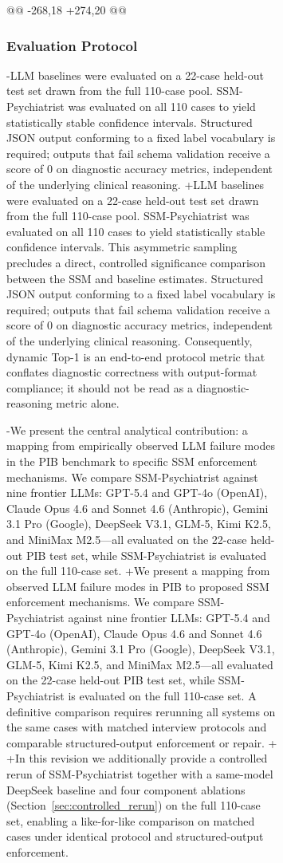 \begin{figure}[t]
{\begin{figure}[!t]
{ 
 
@@ -268,18 +274,20 @@
 
 \subsubsection{Evaluation Protocol}
 
-LLM baselines were evaluated on a 22-case held-out test set drawn from the full 110-case pool. SSM-Psychiatrist was evaluated on all 110 cases to yield statistically stable confidence intervals. Structured JSON output conforming to a fixed label vocabulary is required; outputs that fail schema validation receive a score of 0 on diagnostic accuracy metrics, independent of the underlying clinical reasoning.
+LLM baselines were evaluated on a 22-case held-out test set drawn from the full 110-case pool. SSM-Psychiatrist was evaluated on all 110 cases to yield statistically stable confidence intervals. This asymmetric sampling precludes a direct, controlled significance comparison between the SSM and baseline estimates. Structured JSON output conforming to a fixed label vocabulary is required; outputs that fail schema validation receive a score of 0 on diagnostic accuracy metrics, independent of the underlying clinical reasoning. Consequently, dynamic Top-1 is an end-to-end protocol metric that conflates diagnostic correctness with output-format compliance; it should not be read as a diagnostic-reasoning metric alone.
 
-We present the central analytical contribution: a mapping from empirically observed LLM failure modes in the PIB benchmark to specific SSM enforcement mechanisms. We compare SSM-Psychiatrist against nine frontier LLMs: GPT-5.4 and GPT-4o (OpenAI), Claude Opus 4.6 and Sonnet 4.6 (Anthropic), Gemini 3.1 Pro (Google), DeepSeek V3.1, GLM-5, Kimi K2.5, and MiniMax M2.5---all evaluated on the 22-case held-out PIB test set, while SSM-Psychiatrist is evaluated on the full 110-case set.
+We present a mapping from observed LLM failure modes in PIB to proposed SSM enforcement mechanisms. We compare SSM-Psychiatrist against nine frontier LLMs: GPT-5.4 and GPT-4o (OpenAI), Claude Opus 4.6 and Sonnet 4.6 (Anthropic), Gemini 3.1 Pro (Google), DeepSeek V3.1, GLM-5, Kimi K2.5, and MiniMax M2.5---all evaluated on the 22-case held-out PIB test set, while SSM-Psychiatrist is evaluated on the full 110-case set. A definitive comparison requires rerunning all systems on the same cases with matched interview protocols and comparable structured-output enforcement or repair.
+
+In this revision we additionally provide a controlled rerun of SSM-Psychiatrist together with a same-model DeepSeek baseline and four component ablations (Section~\ref{sec:controlled_rerun}) on the full 110-case set, enabling a like-for-like comparison on matched cases under identical protocol and structured-output enforcement.
 
}
\end{figure}}
\end{figure}
